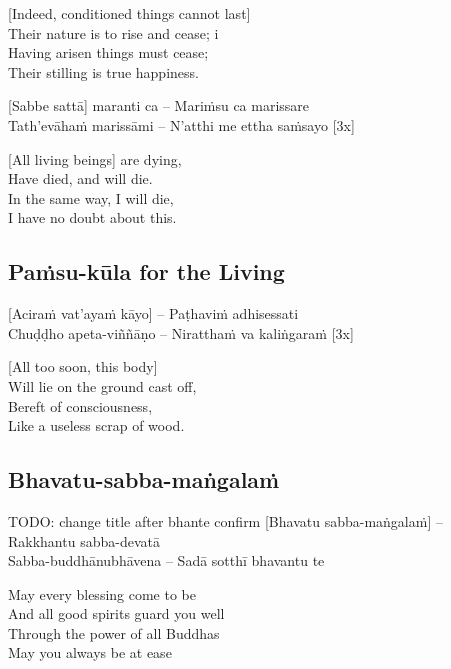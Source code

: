 \begin{english}
  [Indeed, conditioned things cannot last]\\
  Their nature is to rise and cease; i\\
  Having arisen things must cease;\\
  Their stilling is true happiness.
\end{english}

\suttaRef{[DN 16]}

[Sabbe sattā] maranti ca – Mariṁsu ca marissare\\
Tath’evāhaṁ marissāmi – N’atthi me ettha saṁsayo \hfill{[3x]}

\begin{english}
  [All living beings] are dying,\\
  Have died, and will die.\\
  In the same way, I will die,\\
  I have no doubt about this.
\end{english}

\suttaRef{[Thai]}

\subsection{Paṁsu-kūla for the Living}
\label{pamsu-kula-living}
[Aciraṁ vat’ayaṁ kāyo] – Paṭhaviṁ adhisessati\\
Chuḍḍho apeta-viññāṇo – Niratthaṁ va kaliṅgaraṁ \hfill{[3x]}

\begin{english}
  [All too soon, this body]\\
  Will lie on the ground cast off,\\
  Bereft of consciousness,\\
  Like a useless scrap of wood.
\end{english}

\suttaRef{[Dhp 41]}

\subsection{Bhavatu-sabba-maṅgalaṁ}
\label{bhavtu}
TODO: change title after bhante confirm
[Bhavatu sabba-maṅgalaṁ] – Rakkhantu sabba-devatā\\
Sabba-buddhānubhāvena – Sadā sotthī bhavantu te

\begin{english}
  May every blessing come to be\\
  And all good spirits guard you well\\
  Through the power of all Buddhas\\
  May you always be at ease
\end{english}


